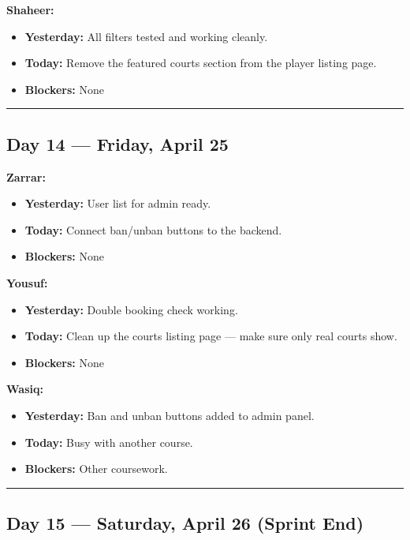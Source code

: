\documentclass[12pt,a4paper]{article}
\begin{document}
\textbf{Shaheer:}
\begin{itemize}[noitemsep]
    \item \textbf{Yesterday:} All filters tested and working cleanly.
    \item \textbf{Today:} Remove the featured courts section from the player listing page.
    \item \textbf{Blockers:} None
\end{itemize}

\vspace{1em}\hrule\vspace{1em}

\subsection*{Day 14 --- Friday, April 25}

\textbf{Zarrar:}
\begin{itemize}[noitemsep]
    \item \textbf{Yesterday:} User list for admin ready.
    \item \textbf{Today:} Connect ban/unban buttons to the backend.
    \item \textbf{Blockers:} None
\end{itemize}

\textbf{Yousuf:}
\begin{itemize}[noitemsep]
    \item \textbf{Yesterday:} Double booking check working.
    \item \textbf{Today:} Clean up the courts listing page --- make sure only real courts show.
    \item \textbf{Blockers:} None
\end{itemize}

\textbf{Wasiq:}
\begin{itemize}[noitemsep]
    \item \textbf{Yesterday:} Ban and unban buttons added to admin panel.
    \item \textbf{Today:} Busy with another course.
    \item \textbf{Blockers:} Other coursework.
\end{itemize}

\vspace{1em}\hrule\vspace{1em}

\subsection*{Day 15 --- Saturday, April 26 (Sprint End)}
\end{document}
